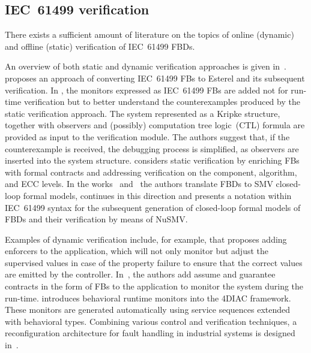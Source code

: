 \documentclass[conference]{IEEEtran}
\begin{document}
\subsection{IEC~61499 verification}
There exists a sufficient amount of literature on the topics of online (dynamic) and offline (static) verification of IEC~61499 FBDs. 

An overview of both static and dynamic verification approaches is given in~\cite{15blech2016comparison}.
\cite{12yoong2010verifying} proposes an approach of converting IEC~61499 FBs to Esterel and its subsequent verification.
In \cite{13yoong2015verification,14bhatti2011observer}, the monitors expressed as IEC~61499 FBs are added not for run-time verification but to better understand the counterexamples produced by the static verification approach. The system represented as a Kripke structure, together with observers and (possibly) computation tree logic~(CTL) formula are provided as input to the verification module. The authors suggest that, if the counterexample is received, the debugging process is simplified, as observers are inserted into the system structure.
\cite{11lindgren2016contract} considers static verification by enriching FBs with formal contracts and addressing verification on the component, algorithm, and ECC levels. In the works~\cite{agn_case_study} and~\cite{agnostic} the authors translate FBDs to SMV closed-loop formal models, \cite{toolchain} continues in this direction and presents a notation within IEC~61499 syntax for the subsequent generation of closed-loop formal models of FBDs and their verification by means of NuSMV. 


Examples of dynamic verification include, for example, \cite{1falcone2022runtime} that proposes adding enforcers to the application, which will not only monitor but adjust the supervised values in case of the property failure to ensure that the correct values are emitted by the controller. In~\cite{3do2020towards, 8ng2019contract}, the authors add assume and guarantee contracts in the form of FBs to the application to monitor the system during the run-time. \cite{4wenger15behavior} introduces behavioral runtime monitors into the 4DIAC framework. These monitors are generated automatically using service sequences extended with behavioral types. Combining various control and verification techniques, a reconfiguration architecture for fault handling in industrial systems is designed in~\cite{10leitao2020fault}. 
\end{document}
